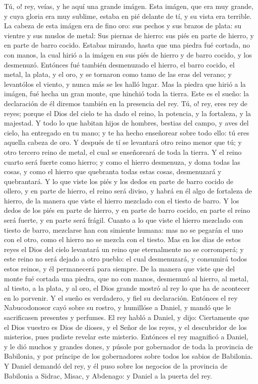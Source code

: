 \bverse Tú, o! rey, veías, y he aquí una grande imágen. Esta imágen, que era muy grande, y cuya gloria era muy sublime, estaba en pié delante de tí, y su vista era terrible.
\bverse La cabeza de esta imágen era de fino oro: sus pechos y sus brazos de plata: su vientre y sus muslos de metal:
\bverse Sus piernas de hierro: sus piés en parte de hierro, y en parte de barro cocido.
\bverse Estabas mirando, hasta que una piedra fué cortada, no con manos, la cual hirió a la imágen en sus piés de hierro y de barro cocido, y los desmenuzó.
\bverse Entónces fué también desmenuzado el hierro, el barro cocido, el metal, la plata, y el oro, y se tornaron como tamo de las eras del verano; y levantólos el viento, y nunca más se les halló lugar. Mas la piedra que hirió a la imágen, fué hecha un gran monte, que hinchió toda la tierra.
\bverse Este es el sueño: la declaración de él diremos también en la presencia del rey.
\bverse Tú, o! rey, eres rey de reyes; porque el Dios del cielo te ha dado el reino, la potencia, y la fortaleza, y la majestad.
\bverse Y todo lo que habitan hijos de hombres, bestias del campo, y aves del cielo, ha entregado en tu mano; y te ha hecho enseñorear sobre todo ello: tú eres aquella cabeza de oro.
\bverse Y después de tí se levantará otro reino menor que tú; y otro tercero reino de metal, el cual se enseñoreará de toda la tierra.
\bverse Y el reino cuarto será fuerte como hierro; y como el hierro desmenuza, y doma todas las cosas, y como el hierro que quebranta todas estas cosas, desmenuzará y quebrantará.
\bverse Y lo que viste los piés y los dedos en parte de barro cocido de ollero, y en parte de hierro, el reino será diviso, y habrá en él algo de fortaleza de hierro, de la manera que viste el hierro mezclado con el tiesto de barro.
\bverse Y los dedos de los piés en parte de hierro, y en parte de barro cocido, en parte el reino será fuerte, y en parte será frágil.
\bverse Cuanto a lo que viste el hierro mezclado con tiesto de barro, mezclarse han con simiente humana: mas no se pegarán el uno con el otro, como el hierro no se mezcla con el tiesto.
\bverse Mas en los dias de estos reyes el Dios del cielo levantará un reino que eternalmente no se corromperá; y este reino no será dejado a otro pueblo: el cual desmenuzará, y consumirá todos estos reinos, y él permanecerá para siempre.
\bverse De la manera que viste que del monte fué cortada una piedra, que no con manos, desmenuzó al hierro, al metal, al tiesto, a la plata, y al oro, el Dios grande mostró al rey lo que ha de acontecer en lo porvenir. Y el sueño es verdadero, y fiel su declaración.
\bverse Entónces el rey Nabucodonosor cayó sobre su rostro, y humillóse a Daniel, y mandó que le sacrificasen presentes y perfumes.
\bverse El rey habló a Daniel, y dijo: Ciertamente que el Dios vuestro es Dios de dioses, y el Señor de los reyes, y el descubridor de los misterios, pues pudiste revelar este misterio.
\bverse Entónces el rey magnificó a Daniel, y le dió muchos y grandes dones, y púsole por gobernador de toda la provincia de Babilonia, y por príncipe de los gobernadores sobre todos los sabios de Babilonia.
\bverse Y Daniel demandó del rey, y él puso sobre los negocios de la provincia de Babilonia a Sidrac, Misac, y Abdenago: y Daniel a la puerta del rey.


